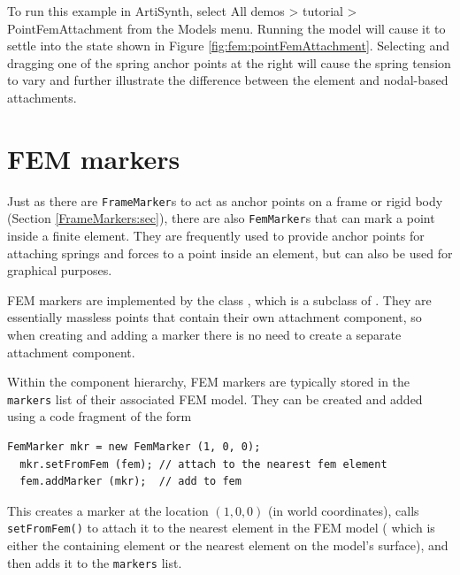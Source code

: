 To run this example in ArtiSynth, select {\sf All demos > tutorial >
PointFemAttachment} from the {\sf Models} menu. Running the model will
cause it to settle into the state shown in Figure
\ref{fig:fem:pointFemAttachment}. Selecting and dragging one of the
spring anchor points at the right will cause the spring tension to
vary and further illustrate the difference between the element
and nodal-based attachments.

\section{FEM markers}

Just as there are {\tt FrameMarker}s to act as anchor points on a frame or
rigid body (Section \ref{FrameMarkers:sec}), there are also {\tt FemMarker}s 
that can mark a point inside a finite element.  They are frequently used to 
provide anchor points for attaching springs and forces to a point inside 
an element, but can also be used for graphical purposes.

FEM markers are implemented by the class
, which
is a subclass of
.
They are essentially massless points that contain their own attachment
component, so when creating and adding a marker there is no need to
create a separate attachment component.

Within the component hierarchy, FEM markers are typically stored in
the {\tt markers} list of their associated FEM model. They can
be created and added using a code fragment of the form
%
\begin{lstlisting}[]
  FemMarker mkr = new FemMarker (1, 0, 0);
  mkr.setFromFem (fem); // attach to the nearest fem element
  fem.addMarker (mkr);  // add to fem
\end{lstlisting}
%
This creates a marker at the location $(1,0,0)$ (in world
coordinates), calls {\tt setFromFem()} to attach it to the nearest
element in the FEM model ( which is either the containing element or
the nearest element on the model's surface), and then adds it to the
{\tt markers} list.

